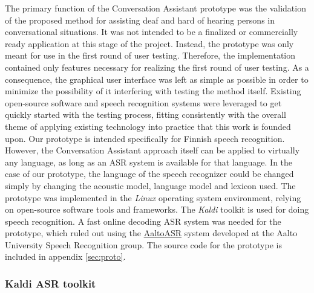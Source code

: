 \documentclass[english, 12pt, a4paper, pdftex, elec, utf8]{aaltothesis}
\begin{document}
The primary function of the Conversation Assistant prototype was the validation of the proposed method for assisting deaf and hard of hearing persons in conversational situations. It was not intended to be a finalized or commercially ready application at this stage of the project. Instead, the prototype was only meant for use in the first round of user testing. Therefore, the implementation contained only features necessary for realizing the first round of user testing. As a consequence, the graphical user interface was left as simple as possible in order to minimize the possibility of it interfering with testing the method itself. Existing open-source software and speech recognition systems were leveraged to get quickly started with the testing process, fitting consistently with the overall theme of applying existing technology into practice that this work is founded upon. Our prototype is intended specifically for Finnish speech recognition. However, the Conversation Assistant approach itself can be applied to virtually any language, as long as an ASR system is available for that language. In the case of our prototype, the language of the speech recognizer could be changed simply by changing the acoustic model, language model and lexicon used. The prototype was implemented in the \textit{Linux} operating system environment, relying on open-source software tools and frameworks. The \textit{Kaldi} toolkit is used for doing speech recognition. A fast online decoding ASR system was needed for the prototype, which ruled out using the \href{https://github.com/aalto-speech/AaltoASR}{AaltoASR} system developed at the Aalto University Speech Recognition group. The source code for the prototype is included in appendix \ref{sec:proto}.

\subsubsection{Kaldi ASR toolkit} \label{sec:kaldi}
\end{document}
